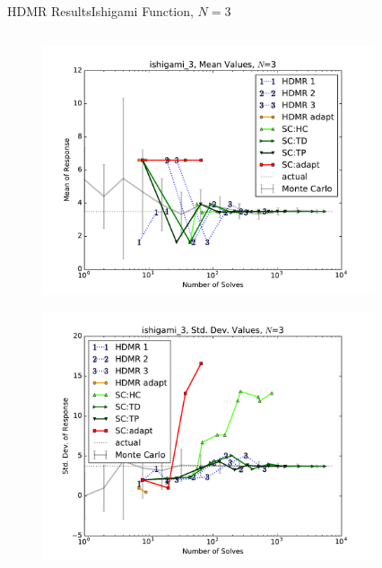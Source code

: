 \documentclass{beamer}
\begin{document}
\begin{frame}{HDMR Results}{Ishigami Function, $N=3$}\vspace{-20pt}
 \begin{columns}
   \begin{column}{0.5\textwidth}
        \begin{figure}[h!]
          \centering
          \includegraphics[width=0.8\linewidth]{anlmodels/ishigami_3_mean_vals}
        \end{figure}
        \vspace{-20pt}
        \begin{figure}[h!]
          \centering
          \includegraphics[width=0.8\linewidth]{anlmodels/ishigami_3_var_vals}
        \end{figure}
   \end{column}
   \begin{column}{0.5\textwidth}
        \begin{figure}[h!]
          \centering

\end{figure}
\end{column}
\end{columns}
\end{frame}
\end{document}
